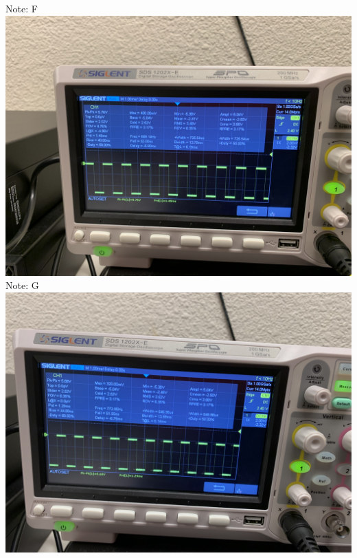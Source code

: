\documentclass[]{article}
\begin{document}
\begin{center}
		Note: F\\
		\includegraphics[scale=.05]{./images/5.jpg}\\
		\pagebreak
		Note: G\\
		\includegraphics[scale=.05]{./images/6.jpg}\\
	\end{center}
	\pagebreak
	
\end{document}
